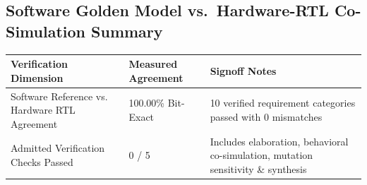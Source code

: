 \documentclass[11pt,a4paper]{article}
\begin{document}
\subsection{Software Golden Model vs.\ Hardware-RTL Co-Simulation Summary}

{\small\renewcommand{\arraystretch}{1.18}\begin{longtable}{@{}L{0.38\textwidth}|L{0.22\textwidth}|L{0.32\textwidth}@{}}\toprule

\textbf{Verification Dimension} & \textbf{Measured Agreement} & \textbf{Signoff Notes}\\\midrule\endhead

Software Reference vs. Hardware RTL Agreement & 100.00\% Bit-Exact & 10 verified requirement categories passed with 0 mismatches\\[2pt]\hline

Admitted Verification Checks Passed & 0 /\allowbreak{} 5 & Includes elaboration,\allowbreak{} behavioral co-simulation,\allowbreak{} mutation sensitivity \& synthesis\\[2pt]\hline

\bottomrule\end{longtable}}
\end{document}
